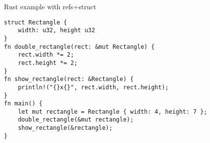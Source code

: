 \usetikzlibrary{positioning,shapes.callouts}
\begin{frame}[fragile,label=rustTimesTwo]{Rust example with refs+struct}
\begin{verbatim}
struct Rectangle {
    width: u32, height u32
}
fn double_rectangle(rect: &mut Rectangle) {
    rect.width *= 2;
    rect.height *= 2;
}
fn show_rectangle(rect: &Rectangle) {
    println!("{}x{}", rect.width, rect.height);
}
fn main() {
    let mut rectangle = Rectangle { width: 4, height: 7 };
    double_rectangle(&mut rectangle);
    show_rectangle(&rectangle);
}
\end{verbatim}
\end{frame}
